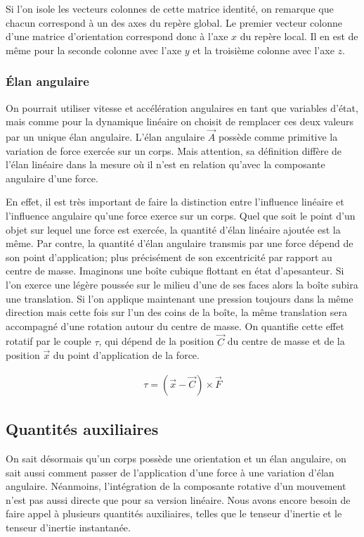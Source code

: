 Si l'on isole les vecteurs colonnes de cette matrice identité, on
remarque que chacun correspond à un des axes du repère global. Le
premier vecteur colonne d'une matrice d'orientation correspond donc à
l'axe $x$ du repère local. Il en est de même pour la seconde colonne
avec l'axe $y$ et la troisième colonne avec l'axe $z$.

\subsubsection{\'Elan angulaire}

On pourrait utiliser vitesse et accélération angulaires en tant que
variables d'état, mais comme pour la dynamique linéaire on choisit de
remplacer ces deux valeurs par un unique élan angulaire. L'élan
angulaire $\vec A$ possède comme primitive la variation de force
exercée sur un corps. Mais attention, sa définition diffère de l'élan
linéaire dans la mesure o\`u il n'est en relation qu'avec la
composante angulaire d'une force.

En effet, il est très important de faire la distinction entre
l'influence linéaire et l'influence angulaire qu'une force exerce sur
un corps. Quel que soit le point d'un objet sur lequel une force est
exercée, la quantité d'élan linéaire ajoutée est la même. Par contre,
la quantité d'élan angulaire transmis par une force dépend de son
point d'application; plus précisément de son excentricité par rapport
au centre de masse. Imaginons une boîte cubique flottant en état
d'apesanteur. Si l'on exerce une légère poussée sur le milieu d'une de
ses faces alors la boîte subira une translation. Si l'on applique
maintenant une pression toujours dans la même direction mais cette
fois sur l'un des coins de la boîte, la même translation sera
accompagné d'une rotation autour du centre de masse. On quantifie
cette effet rotatif par le couple $\tau$, qui dépend de la position
$\vec C$ du centre de masse et de la position $\vec x$ du point
d'application de la force.

\begin{align}
  \tau = (\vec{x} - \vec{C}) \times \vec{F}
\end{align}

\subsection{Quantités auxiliaires}

On sait désormais qu'un corps possède une orientation et un élan
angulaire, on sait aussi comment passer de l'application d'une force à
une variation d'élan angulaire. Néanmoins, l'intégration de la
composante rotative d'un mouvement n'est pas aussi directe que pour sa
version linéaire. Nous avons encore besoin de faire appel à plusieurs
quantités auxiliaires, telles que le tenseur d'inertie et le tenseur
d'inertie instantanée.

